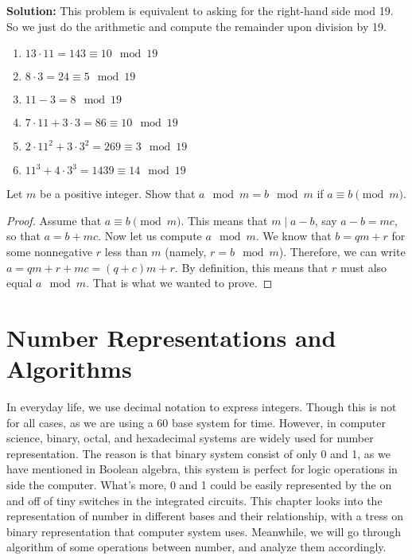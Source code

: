    \textbf{Solution:} This problem is equivalent to asking for the right-hand side mod 19. So we just do the arithmetic and compute the remainder upon division by 19.
    \begin{enumerate}
        \item \( 13 \cdot 11 = 143 \equiv 10 \mod{19} \)
        \item \( 8 \cdot 3 = 24 \equiv 5 \mod{19} \)
        \item \( 11 - 3 = 8 \mod{19} \)
        \item \( 7 \cdot 11 + 3 \cdot 3 = 86 \equiv 10 \mod{19} \)
        \item \( 2 \cdot 11^2 + 3 \cdot 3^2 = 269 \equiv 3 \mod{19} \)
        \item \( 11^3 + 4 \cdot 3^3 = 1439 \equiv 14 \mod{19} \)
    \end{enumerate}

    \begin{exercise}
        Let \( m \) be a positive integer. Show that \( a \mod m = b \mod m \) if \( a \equiv b \pmod{m} \).
    \end{exercise}
    \begin{proof}
        Assume that \( a \equiv b \pmod{m} \). This means that \( m \mid a - b \), say \( a - b = mc \), so that \( a = b + mc \). Now let us compute \( a \mod m \). We know that \( b = qm + r \) for some nonnegative \( r \) less than \( m \) (namely, \( r = b \mod m \)). Therefore, we can write \( a = qm + r + mc = (q + c)m + r \). By definition, this means that \( r \) must also equal \( a \mod m \). That is what we wanted to prove.
    \end{proof}

\section{Number Representations and Algorithms}
    In everyday life, we use decimal notation to express integers. Though this is not
    for all cases, as we are using a 60 base system for time. However, in computer science, binary, octal, and hexadecimal
    systems are widely used for number representation. The reason is that binary system consist of 
    only 0 and 1, as we have mentioned in Boolean algebra, this system is perfect for logic operations
    in side the computer. What's more, 0 and 1 could be easily represented by the on and off of tiny
    switches in the integrated circuits. This chapter looks into the representation of number
    in different bases and their relationship, with a tress on binary representation that computer
    system uses. Meanwhile, we will go through algorithm of some operations between number, and
    analyze them accordingly.
